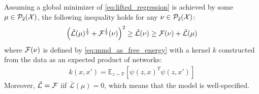 \begin{proposition}\label{prop:inequality_mmd_loss}
	Assuming a global minimizer of \cref{eq:lifted_regression} is achieved by some $\mu\in \mathcal{P}_2({{\mathcal X}})$, the following inequality holds for any $\nu \in \mathcal{P}_2({{\mathcal X}})$:
	\begin{align}\label{eq:inequality_mmd_nn}
		\left(\bar{\mathcal{L}}(\mu)^{\frac{1}{2}} + {{\mathcal F}}^{\frac{1}{2}}(\nu)\right)^2
		\geq 
		\bar{\mathcal{L}}(\nu)
		\geq
		\mathcal{F}(\nu) + \bar{\mathcal{L}}(\mu)
	\end{align}
	where ${{\mathcal F}}(\nu)$ is defined by \cref{eq:mmd_as_free_energy} with  a kernel $k$  constructed from the data as an expected product of networks:
\begin{align}\label{eq:kernel_NN}
	k(x,x') = \mathbb{E}_{z\sim \mathbb{P}} [\psi(z,x)^T\psi(z,x')]
\end{align}
Moreover, $\bar{\mathcal{L}} = {{\mathcal F}}$ iif $\bar{\mathcal{L}}(\mu)=0$, which means that the model is well-specified. 
\end{proposition}
